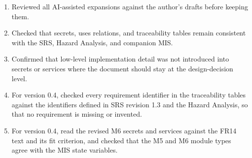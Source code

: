 \documentclass[12pt, titlepage]{article}
\begin{document}
\begin{enumerate}
  \item Reviewed all AI-assisted expansions against the author's drafts before
    keeping them.
  \item Checked that secrets, uses relations, and traceability tables
    remain consistent with the SRS, Hazard Analysis, and companion MIS.
  \item Confirmed that low-level implementation detail was not introduced into
    secrets or services where the document should stay at the design-decision
    level.
  \item For version 0.4, checked every requirement identifier in the
    traceability tables against the identifiers defined in SRS revision 1.3
    and the Hazard Analysis, so that no requirement is missing or invented.
  \item For version 0.4, read the revised M6 secrets and services against the
    FR14 text and its fit criterion, and checked that the M5 and M6 module
    types agree with the MIS state variables.
\end{enumerate}

\newpage{}



\end{document}
